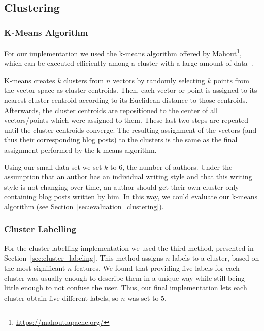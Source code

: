 \subsection{Clustering}
\label{sec:impl_clustering}

\subsubsection{K-Means Algorithm}
\label{sec:impl_k-means}
For our implementation we used the k-means algorithm offered by Mahout\footnote{\url{https://mahout.apache.org/}}, which can be executed efficiently among a cluster with a large amount of data~\cite{esteves2011k}.


K-means creates $k$ clusters from $n$ vectors by randomly selecting $k$ points from the vector space as cluster centroids.
Then, each vector or point is assigned to its nearest cluster centroid according to its Euclidean distance to those centroids.
Afterwards, the cluster centroids are repositioned to the center of all vectors/points which were assigned to them.
These last two steps are repeated until the cluster centroids converge.
The resulting assignment of the vectors (and thus their corresponding blog posts) to the clusters is the same as the final assignment performed by the k-means algorithm.


Using our small data set we set $k$ to $6$, the number of authors.
Under the assumption that an author has an individual writing style and that this writing style is not changing over time, an author should get their own cluster only containing blog posts written by him.
In this way, we could evaluate our k-means algorithm (see Section~\ref{sec:evaluation_clustering}).


\subsubsection{Cluster Labelling}
\label{sec:impl_cluster_labeling}
For the cluster labelling implementation we used the third method, presented in Section~\ref{sec:cluster_labeling}.
This method assigns $n$ labels to a cluster, based on the most significant $n$ features.
We found that providing five labels for each cluster was usually enough to describe them in a unique way while still being little enough to not confuse the user.
Thus, our final implementation lets each cluster obtain five different labels, so $n$ was set to $5$.
